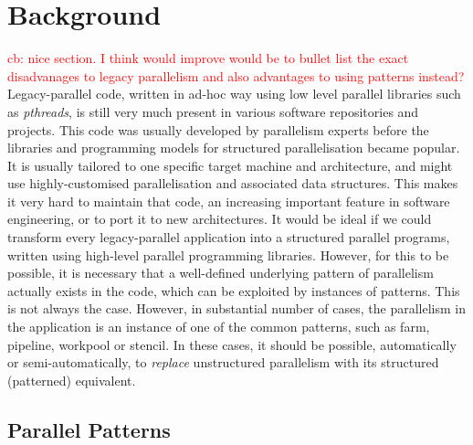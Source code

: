 \section{Background} \label{sec:background}
\textcolor{red}{cb: nice section. I think would improve would be to bullet list the exact disadvanages to legacy parallelism and also advantages to using patterns instead?}
Legacy-parallel code, written in ad-hoc way using low level parallel libraries such as \emph{pthreads}, is still very much present in various software repositories and projects. This code was usually developed by parallelism experts before the libraries and programming models for structured parallelisation became popular. It is usually tailored to one specific target machine and architecture, and might use highly-customised parallelisation and associated data structures. This makes it very hard to maintain that code, an increasing important feature in software engineering, or to port it to new architectures. It would be ideal if we could transform every legacy-parallel application into a structured parallel programs, written using high-level parallel programming libraries. However, for this to be possible, it is necessary that a well-defined underlying pattern of parallelism actually exists in the code, which can be exploited by instances of patterns. This is not always the case. However, in substantial number of cases, the parallelism in the application is an instance of one of the common patterns, such as farm, pipeline, workpool or stencil. In these cases, it should be possible, automatically or semi-automatically, to \emph{replace} unstructured parallelism with its structured (patterned) equivalent.   

\subsection{Parallel Patterns}

